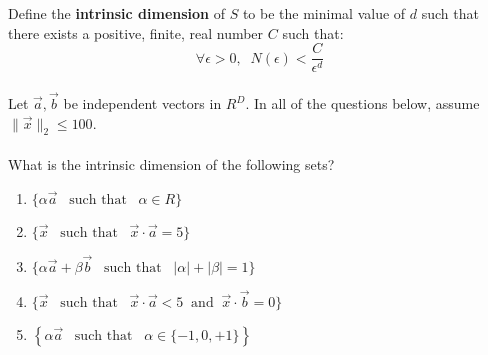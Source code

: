 \documentclass[10pt]{article}
\begin{document}
    Define the {\bf intrinsic dimension} of $S$ to be the minimal value of
    $d$ such that there exists a positive, finite, real number $C$
    such that:
    $$\forall \epsilon>0, \;\; N(\epsilon)< \frac{C}{\epsilon^d}$$ 
    ~\\
    \newcommand{\vx}{\vec{x}}
    \newcommand{\va}{\vec{a}}
    \newcommand{\vb}{\vec{b}}
    Let $\va,\vb$ be independent vectors in $R^D$.  In all of the
    questions below, assume $\|\vx\|_2\leq 100$.\\
    ~\\
    What is the intrinsic dimension of the following sets?
    \begin{enumerate}
    \item $\{\alpha \va \;\;\;\mbox{such that}\;\;\; \alpha \in R\}$  \underline{\hspace{3.15in}}
    \item $\{\vx\;\;\;\mbox{such that}\;\;\;\vx \cdot \va = 5\}$ \underline{\hspace{3.15in}}
    \item $\{\alpha \va + \beta \vb\;\;\;\mbox{such
      that}\;\;\;|\alpha|+|\beta| =1\}$  \underline{\hspace{3.15in}}
    \item $\{\vx\;\;\;\mbox{such that}\;\;\;\vx \cdot \va < 5
      \;\;\mbox{and}\;\; \vx \cdot \vb = 0\}$ \underline{\hspace{3.15in}}
    \item $\left\{ \alpha \va \;\;\;\mbox{such that}\;\;\;\alpha \in
      \{-1,0,+1\} \right\}$ \underline{\hspace{3.15in}}
    \end{enumerate}
\end{document}
